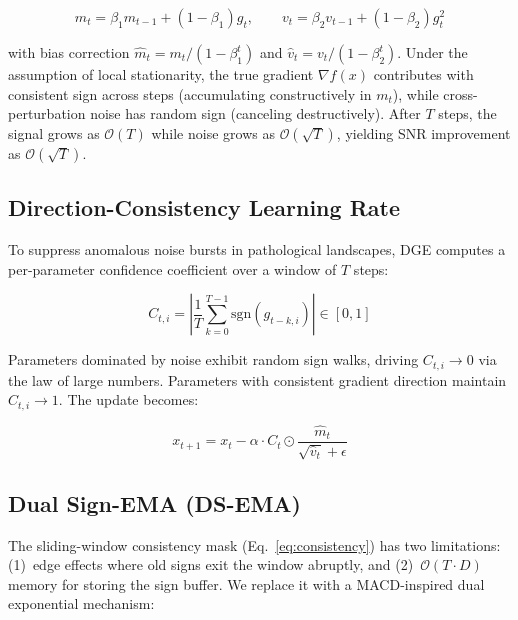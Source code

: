 \documentclass[10pt]{article}
\begin{document}
\begin{equation}
    m_t = \beta_1 m_{t-1} + (1 - \beta_1) g_t, \qquad v_t = \beta_2 v_{t-1} + (1 - \beta_2) g_t^2
    \label{eq:ema}
\end{equation}

\noindent with bias correction $\hat{m}_t = m_t / (1 - \beta_1^t)$ and $\hat{v}_t = v_t / (1 - \beta_2^t)$. Under the assumption of local stationarity, the true gradient $\nabla f(x)$ contributes with consistent sign across steps (accumulating constructively in $m_t$), while cross-perturbation noise has random sign (canceling destructively). After $T$ steps, the signal grows as $\mathcal{O}(T)$ while noise grows as $\mathcal{O}(\sqrt{T})$, yielding SNR improvement as $\mathcal{O}(\sqrt{T})$.

\subsection{Direction-Consistency Learning Rate}
\label{sec:consistency}

To suppress anomalous noise bursts in pathological landscapes, DGE computes a per-parameter confidence coefficient over a window of $T$ steps:

\begin{equation}
    C_{t,i} = \left| \frac{1}{T} \sum_{k=0}^{T-1} \text{sgn}(g_{t-k,i}) \right| \in [0, 1]
    \label{eq:consistency}
\end{equation}

Parameters dominated by noise exhibit random sign walks, driving $C_{t,i} \to 0$ via the law of large numbers. Parameters with consistent gradient direction maintain $C_{t,i} \to 1$. The update becomes:

\begin{equation}
    x_{t+1} = x_t - \alpha \cdot C_t \odot \frac{\hat{m}_t}{\sqrt{\hat{v}_t} + \epsilon}
    \label{eq:update}
\end{equation}

\subsection{Dual Sign-EMA (DS-EMA)}
\label{sec:ds_ema}

The sliding-window consistency mask (Eq.~\ref{eq:consistency}) has two limitations: (1)~edge effects where old signs exit the window abruptly, and (2)~$\mathcal{O}(T \cdot D)$ memory for storing the sign buffer. We replace it with a MACD-inspired dual exponential mechanism:
\end{document}
